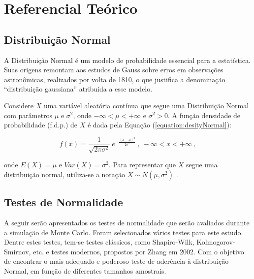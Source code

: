 \documentclass[a4paper,11pt]{article} %
\begin{document}
\section{Referencial Teórico} %

\subsection{Distribuição Normal} %

A Distribuição Normal é um modelo de probabilidade essencial para a estatística. Suas origens remontam aos estudos de Gauss sobre erros em observações astronômicas, realizados por volta de 1810, o que justifica a denominação “distribuição gaussiana” atribuída a esse modelo.

\vspace{0.5cm}

Considere $X$ uma variável aleatória contínua que segue uma Distribuição Normal com parâmetros $\mu$ e $\sigma^{2}$, onde $-\infty < \mu < +\infty$ e $\sigma^{2} > 0$. A função densidade de probabilidade (f.d.p.) de $X$ é dada pela Equação (\ref{equation:desityNormal}):

\begin{equation}
    f(x) = \dfrac{1}{\sqrt{2 \pi \sigma^2}} \ e^{{- \frac{(x - \mu)^{2}}{2 \sigma^2}}} \ , \ - \infty < x < +\infty \ ,
    \label{equation:desityNormal}
\end{equation}

\noindent onde $E(X) = \mu$ e $Var(X) = \sigma^2$. Para representar que $X$ segue uma distribuição normal, utiliza-se a notação $X \sim N(\mu, \sigma^2)$ \cite{bussab2010estatistica}.

\subsection{Testes de Normalidade} \label{section:tests_norm} %

A seguir serão apresentados os testes de normalidade que serão avaliados durante a simulação de Monte Carlo. Foram selecionados vários testes para este estudo. Dentre estes testes, tem-se testes clássicos, como Shapiro-Wilk, Kolmogorov-Smirnov, etc. e testes modernos, propostos por Zhang em 2002. Com o objetivo de encontrar o mais adequado e poderoso teste de aderência à distribuição Normal, em função de diferentes tamanhos amostrais.
\end{document}
